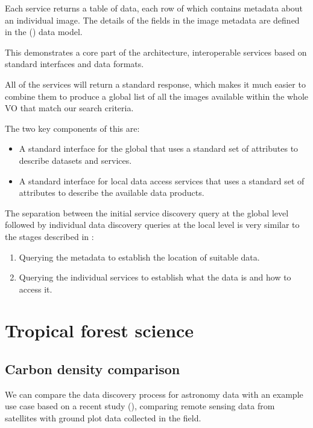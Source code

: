 \documentclass{article}
\begin{document}
Each \cite{ivoa-sia} service returns a table of data, each row of which
contains metadata about an individual image. The details of the fields
in the image metadata are defined in the 
(\cite{ivoa-obscore}) data model.

This demonstrates a core part of the \cite{ivoa} architecture, interoperable
services based on standard interfaces and data formats.

All of the \cite{ivoa-sia} services will return a standard response, which
makes it much easier to combine them to produce a global list of all the
images available within the whole VO that match our search criteria.

\noindent
The two key components of this are:
\begin{itemize}
    \item A standard interface for the global \cite{ivoa-reg} that uses a
    standard set of attributes to describe datasets and services.
    \item A standard interface for local \cite{ivoa-sia} data access services
    that uses a standard set of attributes to describe the available data
    products.
\end{itemize}

The separation between the initial service discovery query at the global
level followed by individual data discovery queries at the local level is
very similar to the stages described in \cite{jones-2006}:
\begin{enumerate}
  \item Querying the metadata to establish the location of suitable data.
  \item Querying the individual services to establish what the data is and
  how to access it.
\end{enumerate}

\section{Tropical forest science}

\subsection{Carbon density comparison}

We can compare the \cite{vo} data discovery process for astronomy data with
an example use case based on a recent study 
(\cite{mitchard-2014}), comparing remote sensing data from satellites with
ground plot data collected in the field.
\end{document}
